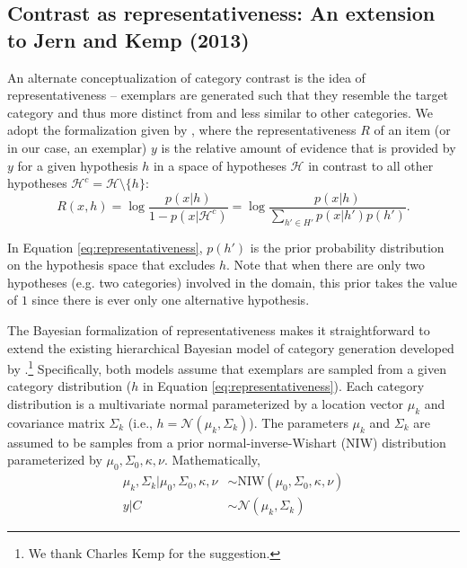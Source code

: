 \documentclass[12pt]{article}
\begin{document}
\begin{flushleft}
\subsection{Contrast as representativeness: An extension to Jern and Kemp
(2013)}
\label{section:representativeness-definition}

An alternate conceptualization of category contrast is the idea of
representativeness -- exemplars are generated such that they resemble the target category and thus more distinct from and less
similar to other categories. We adopt the formalization given by
\cite{tenenbaum01}, where the representativeness $R$ of an item (or in our case,
an exemplar) $y$ is the relative amount of evidence that is provided by $y$ for
a given hypothesis $h$ in a space of hypotheses $\mathcal{H}$ in contrast to all other hypotheses $\mathcal{H}^c=\mathcal{H} \setminus \{h\}$:
\begin{equation}
  R(x,h) = \log \dfrac{p(x|h)}{1-p(x|\mathcal{H}^c)} = \log \dfrac{p(x|h)}{\sum_{h'\in H'}{p(x|h')p(h')}} . 
\label{eq:representativeness}
\end{equation}

In Equation \ref{eq:representativeness}, $p(h')$ is the prior probability
distribution on the hypothesis space that excludes $h$. Note that when there are
only two hypotheses (e.g. two categories) involved in the domain, this prior
takes the value of $1$ since there is ever only one alternative hypothesis. 

The Bayesian formalization of representativeness makes it straightforward to
extend the existing hierarchical Bayesian model of category generation
developed by \cite{jern2013probabilistic}.\footnote{We thank Charles Kemp for the suggestion.} Specifically, both models assume that
exemplars are sampled from a given category distribution ($h$ in
Equation \ref{eq:representativeness}). Each category distribution is a
multivariate normal parameterized by a location vector $\mu_k$ and covariance
matrix $\Sigma_k$ (i.e., $h = \mathcal{N}(\mu_k,\Sigma_k)$). The parameters
$\mu_k$ and $\Sigma_k$ are assumed to be samples from a prior
normal-inverse-Wishart (NIW) distribution parameterized by
$\mu_0,\Sigma_0,\kappa,\nu$. Mathematically,
\begin{align}
  \mu_k, \Sigma_k|\mu_0,\Sigma_0,\kappa,\nu &\sim
                                              \textrm{NIW}(\mu_0,\Sigma_0,\kappa,\nu)
                                              \label{eq:mvnsample}\\
  y|C &\sim \mathcal{N}(\mu_k,\Sigma_k) \label{eq:exemplarsample}
\end{align}


\end{flushleft}
\end{document}
